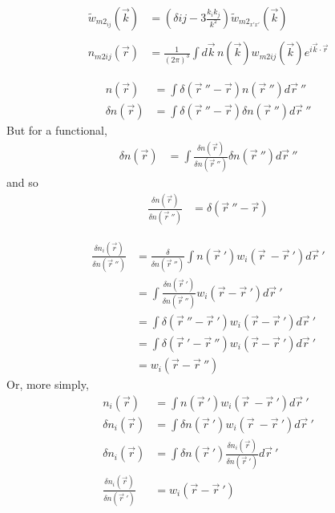 \documentclass[double,12pt]{beavtex}
\begin{document}
\begin{align}
    \widetilde{w}_{m2_{ij}}(\vec{k}) &= (\delta{ij}-3\frac{k_ik_j}{k^2})
                                    \widetilde{w}_{{m2}_{x'x'}}(\vec{k}) \\ \nonumber \\
    n_{m2ij}(\vec r) &=  \frac{1}{\left(2\pi\right)^3}\int d\vec k\, 
                       n(\vec k) w_{m2ij}(\vec k)e^{i\vec k\cdot \vec r}
\end{align} 

\begin{align} 
  n(\vec r) &= \int \delta (\vec r~''-\vec r)n(\vec r~'') d\vec r~''\\
  \delta n(\vec r) &= \int \delta (\vec r~''-\vec r)\delta n(\vec r~'')
  d\vec r~''
\end{align} 
But for a functional,
\begin{align} 
\delta n(\vec r) &= \int \frac{\delta n(\vec r)}{\delta n(\vec r~'')}
\delta n(\vec r~'')d\vec r~''
\end{align} 
and so
\begin{align} 
  \frac{\delta n(\vec r)}{\delta n(\vec r~'')} &= \delta (\vec r~''-\vec r)
\end{align} 

\begin{align} 
   \frac{\delta n_i(\vec r)}{\delta n(\vec r~'')}  &= \frac{\delta}
   {\delta n(\vec r~'')}\int n(\vec r~')w_i(\vec r~-\vec r~')d\vec r~'\\
   &= \int \frac{\delta n(\vec r~')}{\delta n(\vec r~'')}w_i(\vec r
   -\vec r~') d\vec r~' \\
   &= \int \delta (\vec r~'' -\vec r~')w_i(\vec r-\vec r~') d\vec r~'\\
   &= \int \delta (\vec r~' -\vec r~'')w_i(\vec r-\vec r~') d\vec r~'\\
   &= w_i(\vec r-\vec r~'') 
\end{align}
Or, more simply,
\begin{align} 
   n_i(\vec r)  &= \int n(\vec r~')w_i(\vec r~-\vec r~')d\vec r~'\\
   \delta n_i(\vec r)  &= \int \delta n(\vec r~')w_i(\vec r~-\vec r~')d\vec r~'\\
   \delta n_i(\vec r)  &= \int \delta n(\vec r~')\frac{\delta n_i(\vec r)}{\delta n(\vec r~')}d\vec r~'\\
   \frac{\delta n_i(\vec r)}{\delta n(\vec r~')}&= w_i(\vec r-\vec r~') 
\end{align}
\end{document}
